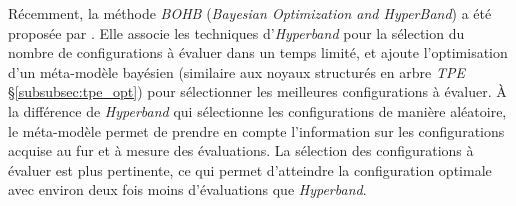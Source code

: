 Récemment, la méthode \textit{BOHB} (\textit{Bayesian Optimization and HyperBand}) a été proposée par \citeauthor{falkner_combining_2017} \cite{falkner_combining_2017, falkner_bohb_2018}.
Elle associe les techniques d'\textit{Hyperband} pour la sélection du nombre de configurations à évaluer dans un temps limité, et ajoute l'optimisation d'un méta-modèle bayésien (similaire aux noyaux structurés en arbre \textit{TPE} §\ref{subsubsec:tpe_opt}) pour sélectionner les meilleures configurations à évaluer.
À la différence de \textit{Hyperband} qui sélectionne les configurations de manière aléatoire, le méta-modèle permet de prendre en compte l'information sur les configurations acquise au fur et à mesure des évaluations.
La sélection des configurations à évaluer est plus pertinente, ce qui permet d'atteindre la configuration optimale avec environ deux fois moins d'évaluations que \textit{Hyperband}.
%
%
